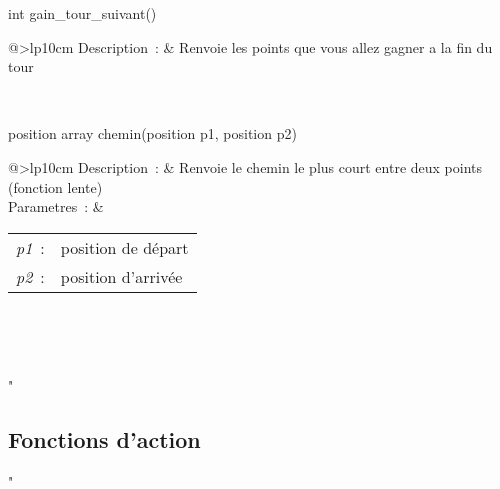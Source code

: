 \begin{minipage}{\linewidth}

\begin{lst-c++}
int gain_tour_suivant()
\end{lst-c++}

\noindent
\begin{tabular}[t]{@{\extracolsep{0pt}}>{\bfseries}lp{10cm}}
Description~: & Renvoie les points que vous allez gagner a la fin du tour \\







\end{tabular} \\[0.3cm]
\end{minipage}


\begin{minipage}{\linewidth}

\begin{lst-c++}
position array chemin(position p1, position p2)
\end{lst-c++}

\noindent
\begin{tabular}[t]{@{\extracolsep{0pt}}>{\bfseries}lp{10cm}}
Description~: & Renvoie le chemin le plus court entre deux points (fonction lente) \\


Parametres~: &
\begin{tabular}[t]{@{\extracolsep{0pt}}ll}
    
    
      
        \textsl{p1}~: & position de départ \\
      
    
      
        \textsl{p2}~: & position d'arrivée \\
      
    
  \end{tabular} \\






\end{tabular} \\[0.3cm]
\end{minipage}

"\subsection{Fonctions d'action}"


